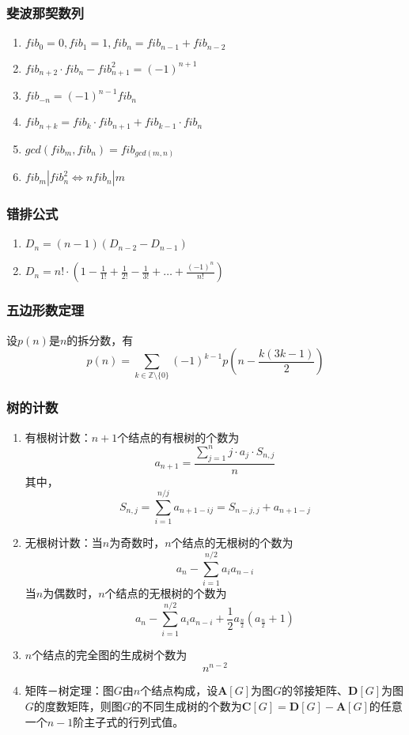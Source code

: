 \documentclass[a4paper]{article}
\begin{document}
\subsubsection{斐波那契数列}

\begin{enumerate}
	\item $fib_0=0, fib_1=1, fib_n=fib_{n-1}+fib_{n-2}$
	\item $fib_{n+2} \cdot fib_n-fib_{n+1}^2=(-1)^{n+1}$
	\item $fib_{-n}=(-1)^{n-1}fib_n$
	\item $fib_{n+k}=fib_k \cdot fib_{n+1}+fib_{k-1} \cdot fib_n$
	\item $gcd(fib_m, fib_n)=fib_{gcd(m, n)}$
	\item $fib_m|fib_n^2\Leftrightarrow nfib_n|m$
\end{enumerate}

\subsubsection{错排公式}

\begin{enumerate}
	\item $D_n = (n-1)(D_{n-2}-D_{n-1})$
	\item $D_n = n! \cdot (1-\frac{1}{1!}+\frac{1}{2!}-\frac{1}{3!}+\ldots+\frac{(-1)^n}{n!})$
\end{enumerate}

\subsubsection{五边形数定理}

设$p(n)$是$n$的拆分数，有$$p(n) = \sum_{k \in \mathbb{Z} \setminus \{0\}} (-1)^{k - 1} p\left(n - \frac{k(3k - 1)}{2}\right)$$

\subsubsection{树的计数}

\begin{enumerate}
	\item 有根树计数：$n+1$个结点的有根树的个数为
		$$a_{n+1} = \frac{\sum_{j=1}^{n}{j \cdot a_j \cdot{S_{n, j}}}}{n}$$
	其中，
		$$S_{n, j} = \sum_{i=1}^{n/j}{a_{n+1-ij}} = S_{n-j, j} + a_{n+1-j}$$
	\item 无根树计数：当$n$为奇数时，$n$个结点的无根树的个数为
		$$a_n-\sum_{i=1}^{n/2}{a_ia_{n-i}}$$
	当$n$为偶数时，$n$个结点的无根树的个数为
		$$a_n-\sum_{i=1}^{n/2}{a_ia_{n-i}}+\frac{1}{2}a_{\frac{n}{2}}(a_{\frac{n}{2}}+1)$$
	\item $n$个结点的完全图的生成树个数为
		$$n^{n-2}$$
	\item 矩阵－树定理：图$G$由$n$个结点构成，设$\bm{A}[G]$为图$G$的邻接矩阵、$\bm{D}[G]$为图$G$的度数矩阵，则图$G$的不同生成树的个数为$\bm{C}[G] = \bm{D}[G] - \bm{A}[G]$的任意一个$n-1$阶主子式的行列式值。
\end{enumerate}
\end{document}
